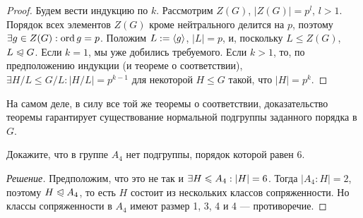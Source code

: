 \begin{proof}
	Будем вести индукцию по $k$. Рассмотрим $Z(G)$, $|Z(G)| = p^l$, $l > 1$. Порядок всех элементов $Z(G)$ кроме нейтрального делится на $p$, поэтому $\exists g \in Z(G): \operatorname{ord}{g} = p$. Положим $L := \langle g\rangle$, $|L| = p$, и, поскольку $L \le Z(G)$, $L \trianglelefteqslant G$. Если $k = 1$, мы уже добились требуемого. Если $k > 1$, то, по предположению индукции (и теореме о соответствии), $\exists H / L \le G / L: |H / L| = p^{k-1}$ для некоторой $H \le G$ такой, что $|H| = p^k$.
\end{proof}

\begin{note}
	На самом деле, в силу все той же теоремы о соответствии, доказательство теоремы гарантирует существование нормальной подгруппы заданного порядка в $G$.
\end{note}

\begin{exercise}
	Докажите, что в группе $A_4$ нет подгруппы, порядок которой равен 6.
\end{exercise}

\begin{proof}[Решение]
	Предположим, что это не так и $\exists H \le A_4: |H| \hm= 6$. Тогда $|A_4 : H| = 2$, поэтому $H \trianglelefteqslant A_4$, то есть $H$ состоит из нескольких классов сопряженности. Но классы сопряженности в $A_4$ имеют размер 1, 3, 4 и 4 --- противоречие.
\end{proof}